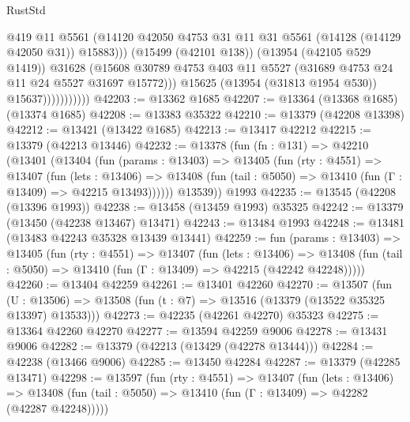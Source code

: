 \begin{lexlean}{RustStd}
\begin{coremodule}
                                @419
                                @11
                                @5561
                                (@14120
                                  @42050
                                  @4753
                                  @31
                                  @11
                                  @31
                                  @5561
                                  (@14128 (@14129 @42050 @31))
                                  @15883)))
                            (@15499 (@42101 @138))
                            (@13954 (@42105 @529 @1419))
                            @31628
                            (@15608
                              @30789
                              @4753
                              @403
                              @11
                              @5527
                              (@31689 @4753 @24 @11 @24 @5527 @31697 @15772)))
                          @15625
                          (@13954 (@31813 @1954 @530))
                          @15637)))))))))))
@42203 := @13362 @1685
@42207 := @13364 (@13368 @1685) (@13374 @1685)
@42208 := @13383 @35322
@42210 := @13379 (@42208 @13398)
@42212 := @13421 (@13422 @1685)
@42213 := @13417 @42212
@42215 := @13379 (@42213 @13446)
@42232 := @13378
    (fun (fn : @131) =>
    @42210
      (@13401
        (@13404
          (fun (params : @13403) =>
          @13405
            (fun (rty : @4551) =>
            @13407
              (fun (lets : @13406) =>
              @13408 (fun (tail : @5050) => @13410 (fun (Γ : @13409) => @42215 @13493))))))
        @13539))
    @1993
@42235 := @13545 (@42208 (@13396 @1993))
@42238 := @13458 (@13459 @1993) @35325
@42242 := @13379 (@13450 (@42238 @13467) @13471)
@42243 := @13484 @1993
@42248 := @13481 (@13483 @42243 @35328 @13439 @13441)
@42259 := fun (params : @13403) =>
  @13405
    (fun (rty : @4551) =>
    @13407
      (fun (lets : @13406) =>
      @13408 (fun (tail : @5050) => @13410 (fun (Γ : @13409) => @42215 (@42242 @42248)))))
@42260 := @13404 @42259
@42261 := @13401 @42260
@42270 := @13507
    (fun (U : @13506) => @13508 (fun (t : @7) => @13516 (@13379 (@13522 @35325 @13397) @13533)))
@42273 := @42235 (@42261 @42270) @35323
@42275 := @13364 @42260 @42270
@42277 := @13594 @42259 @9006
@42278 := @13431 @9006
@42282 := @13379 (@42213 (@13429 (@42278 @13444)))
@42284 := @42238 (@13466 @9006)
@42285 := @13450 @42284
@42287 := @13379 (@42285 @13471)
@42298 := @13597
    (fun (rty : @4551) =>
    @13407
      (fun (lets : @13406) =>
      @13408 (fun (tail : @5050) => @13410 (fun (Γ : @13409) => @42282 (@42287 @42248)))))

\end{coremodule}
\end{lexlean}
